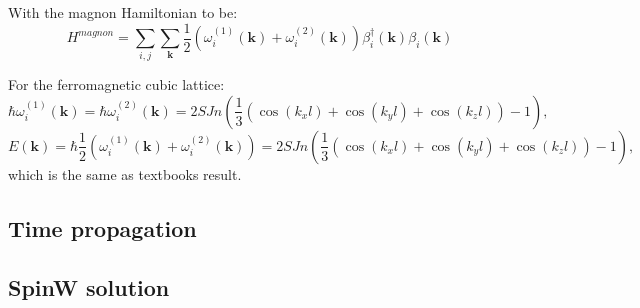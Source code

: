 \documentclass[a4paper,12pt]{article}
\begin{document}
            With the magnon Hamiltonian to be:
            \begin{equation}
                H^{magnon} = \sum_{i,j}\sum_{\boldsymbol{k}}\dfrac{1}{2}(\omega_i^{(1)}(\boldsymbol{k}) + \omega_i^{(2)}(\boldsymbol{k}))
                \beta^{\dag}_i(\boldsymbol{k})\beta_i(\boldsymbol{k})
            \end{equation}

            For the ferromagnetic cubic lattice:
            \begin{equation}
                \hbar \omega_i^{(1)}(\boldsymbol{k}) =
                \hbar \omega_i^{(2)}(\boldsymbol{k}) = 
                2SJn\left(\dfrac{1}{3}\left(\cos(k_xl) + \cos(k_yl) + \cos(k_zl)\right) - 1\right),
            \end{equation}
            \begin{equation}
                E(\boldsymbol{k}) = 
                \hbar \dfrac{1}{2}(\omega_i^{(1)}(\boldsymbol{k}) +
                \omega_i^{(2)}(\boldsymbol{k})) = 
                2SJn\left(\dfrac{1}{3}\left(\cos(k_xl) + \cos(k_yl) + \cos(k_zl)\right) - 1\right),
            \end{equation}
            which is the same as textbooks result.

        \subsection{Time propagation}

        \subsection{SpinW solution}\label{sec:spinw}
\end{document}
